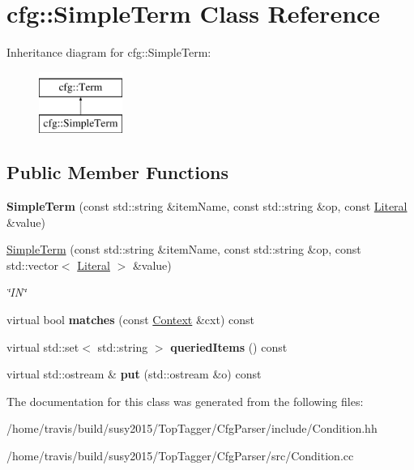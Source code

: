 \hypertarget{classcfg_1_1SimpleTerm}{\section{cfg\-:\-:Simple\-Term Class Reference}
\label{classcfg_1_1SimpleTerm}
}
Inheritance diagram for cfg\-:\-:Simple\-Term\-:\begin{figure}[H]
\begin{center}
\leavevmode
\includegraphics[height=2.000000cm]{classcfg_1_1SimpleTerm}
\end{center}
\end{figure}
\subsection*{Public Member Functions}
\begin{DoxyCompactItemize}
\item 
\hypertarget{classcfg_1_1SimpleTerm_a75fb72281bef8ed5836c9dcd2f7fbdc6}{{\bfseries Simple\-Term} (const std\-::string \&item\-Name, const std\-::string \&op, const \hyperlink{classcfg_1_1Literal}{Literal} \&value)}\label{classcfg_1_1SimpleTerm_a75fb72281bef8ed5836c9dcd2f7fbdc6}

\item 
\hypertarget{classcfg_1_1SimpleTerm_a339edfb7a0039617df99d96cf2d3ca76}{\hyperlink{classcfg_1_1SimpleTerm_a339edfb7a0039617df99d96cf2d3ca76}{Simple\-Term} (const std\-::string \&item\-Name, const std\-::string \&op, const std\-::vector$<$ \hyperlink{classcfg_1_1Literal}{Literal} $>$ \&value)}\label{classcfg_1_1SimpleTerm_a339edfb7a0039617df99d96cf2d3ca76}

\begin{DoxyCompactList}\small\item\em \char`\"{}\-I\-N\char`\"{} \end{DoxyCompactList}\item 
\hypertarget{classcfg_1_1SimpleTerm_a14ee322178830857278e9d1ae0f1cfa8}{virtual bool {\bfseries matches} (const \hyperlink{classcfg_1_1Context}{Context} \&cxt) const }\label{classcfg_1_1SimpleTerm_a14ee322178830857278e9d1ae0f1cfa8}

\item 
\hypertarget{classcfg_1_1SimpleTerm_a208a5ea6db041e9cae39946c914805e5}{virtual std\-::set$<$ std\-::string $>$ {\bfseries queried\-Items} () const }\label{classcfg_1_1SimpleTerm_a208a5ea6db041e9cae39946c914805e5}

\item 
\hypertarget{classcfg_1_1SimpleTerm_ab118b79bc95b7a1e22670ead1f352c89}{virtual std\-::ostream \& {\bfseries put} (std\-::ostream \&o) const }\label{classcfg_1_1SimpleTerm_ab118b79bc95b7a1e22670ead1f352c89}

\end{DoxyCompactItemize}


The documentation for this class was generated from the following files\-:\begin{DoxyCompactItemize}
\item 
/home/travis/build/susy2015/\-Top\-Tagger/\-Cfg\-Parser/include/Condition.\-hh\item 
/home/travis/build/susy2015/\-Top\-Tagger/\-Cfg\-Parser/src/Condition.\-cc\end{DoxyCompactItemize}
